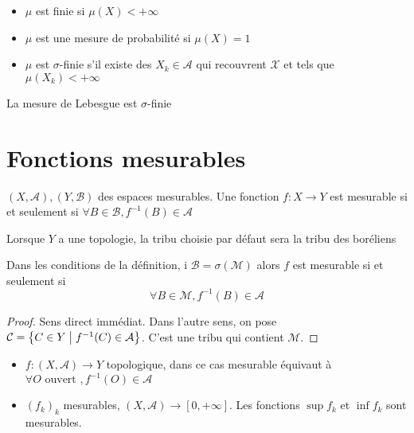 \begin{dfn}
\begin{itemize}
    \item $\mu$ est finie si  $\mu(X)<+\infty$
    \item  $\mu$ est une mesure de probabilité si  $\mu(X)=1$ 
    \item $\mu$ est $\sigma$-finie  s'il existe des $X_k \in  \mathcal  A$ qui recouvrent $\mathcal  X$ et tels que $\mu(X_k)<+\infty$
\end{itemize}
\end{dfn}

\begin{rem}
La mesure de Lebesgue est $\sigma$-finie
\end{rem}

\section{Fonctions mesurables}

\begin{dfn}
    $(X, \mathcal  A), (Y, \mathcal  B)$ des espaces mesurables. Une fonction $f:X \longrightarrow Y$ est mesurable  si et seulement si $\forall  B \in  \mathcal  B, f^{-1}(B) \in  \mathcal A$
\end{dfn}

\begin{rem}
Lorsque $Y$ a une topologie, la tribu choisie par défaut sera la tribu des boréliens
\end{rem}

\begin{prop}
    Dans les conditions de la définition,  i $ \mathcal  B=\sigma(\mathcal  M)$ alors $f$ est mesurable si et seulement si \[
        \forall  B \in  \mathcal  M, f^{-1}(B) \in  \mathcal  A
    \] 
\end{prop}

\begin{proof}
    Sens direct immédiat. Dans l'autre sens, on pose $\mathcal C= \left\{  C \in  Y \suchthat f^{-1}(C) \in  \mathcal  A \right\} $. C'est une tribu qui contient $\mathcal  M$.
\end{proof}

\begin{cor}
    \begin{itemize}
        \item $f: (X, \mathcal  A)\longrightarrow Y$ topologique, dans ce cas mesurable équivaut à  $\forall  O \text{ ouvert }, f^{-1}(O) \in  \mathcal  A$
        \item $(f_k)_k$ mesurables,  $(X, \mathcal  A)\longrightarrow [0, +\infty]$. Les fonctions $\sup f_k$ et  $\inf f_k$ sont mesurables.
    \end{itemize}
\end{cor}

